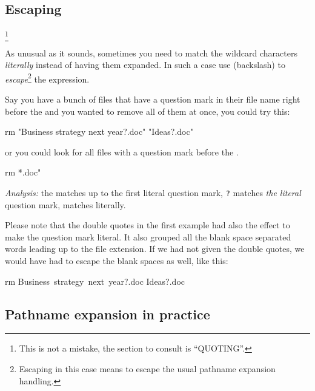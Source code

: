 \documentclass{olli-handout}
\begin{document}
\subsection{Escaping}

\begin{refmanbash}
\footnote{This is not a mistake, the section to consult is ``QUOTING''.}
\end{refmanbash}

As unusual as it sounds, sometimes you need to match the wildcard characters \emph{literally} instead of having them expanded. In such a case use \TT{\textbackslash} (backslash) to \emph{escape}\footnote{Escaping in this case means to escape the usual pathname expansion handling.} the expression.

Say you have a bunch of  files that have a question mark in their file name right before the  and you wanted to remove all of them at once, you could try  this:

\begin{GenericListing}
rm "Business strategy next year?.doc" "Ideas?.doc"
\end{GenericListing}

or you could look for all files with a question mark before the .

\begin{GenericListing}
rm *\?.doc"
\end{GenericListing}

\emph{Analysis:} the \TT{\*} matches up to the first literal question mark, \verb|?| matches \emph{the literal} question mark,  matches literally.

\begin{hintbox}
    {\olliPenR} Please note that the double quotes in the first example had also the effect to make the question mark literal. It also grouped all the blank space separated words leading up to the file extension. If we had not given the double quotes, we would have had to escape the blank spaces as well, like this:

    \begin{GenericListing}
    rm Business\ strategy\ next\ year?.doc Ideas?.doc
    \end{GenericListing}
\end{hintbox}

\subsection{Pathname expansion in practice}
\end{document}
